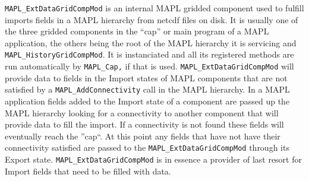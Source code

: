 %  
%  
%  
{\tt MAPL\_ExtDataGridCompMod} is an internal MAPL gridded component 
used to fulfill imports fields in a MAPL hierarchy from netcdf files
on disk.
It is usually one of the
three gridded components in the ``cap'' or main program of a MAPL application,
the others being the root of the MAPL hierarchy it is servicing and {\tt MAPL\_HistoryGridCompMod}. It is
instanciated and all its registered methods are run automatically by
{\tt MAPL\_Cap,} if that is used.
{\tt MAPL\_ExtDataGridCompMod} will provide
data to fields in the Import states of MAPL components that are not satisfied by a \texttt{MAPL\_AddConnectivity} call
in the MAPL
hierarchy. In a MAPL application fields added to the Import state of a component
are passed up the MAPL hierarchy looking for a connectivity to another component that will
provide data to fill the import. If a connectivity is not found these fields will eventually reach
the ''cap``. At this point any fields that have not have their connectivity satisfied
are passed to the {\tt MAPL\_ExtDataGridCompMod} through its Export state.
{\tt MAPL\_ExtDataGridCompMod} is in essence a provider of last resort for Import fields that
need to be filled with data.

